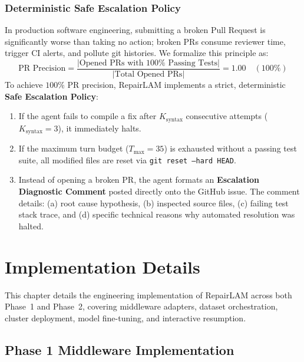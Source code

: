 \documentclass[12pt,a4paper]{report}
\begin{document}
\subsection{Deterministic Safe Escalation Policy}
In production software engineering, submitting a broken Pull Request is significantly worse than taking no action; broken PRs consume reviewer time, trigger CI alerts, and pollute git histories. We formalize this principle as:
\begin{equation}
    \text{PR Precision} = \frac{|\text{Opened PRs with } 100\% \text{ Passing Tests}|}{|\text{Total Opened PRs}|} = 1.00 \quad (100\%)
\end{equation}
To achieve $100\%$ PR precision, RepairLAM implements a strict, deterministic \textbf{Safe Escalation Policy}:
\begin{enumerate}
    \item If the agent fails to compile a fix after $K_{\text{syntax}}$ consecutive attempts ($K_{\text{syntax}} = 3$), it immediately halts.
    \item If the maximum turn budget ($T_{\text{max}} = 35$) is exhausted without a passing test suite, all modified files are reset via \texttt{git reset --hard HEAD}.
    \item Instead of opening a broken PR, the agent formats an \textbf{Escalation Diagnostic Comment} posted directly onto the GitHub issue. The comment details: (a) root cause hypothesis, (b) inspected source files, (c) failing test stack trace, and (d) specific technical reasons why automated resolution was halted.
\end{enumerate}

\newpage
\chapter{Implementation Details}

This chapter details the engineering implementation of RepairLAM across both Phase~1 and Phase~2, covering middleware adapters, dataset orchestration, cluster deployment, model fine-tuning, and interactive resumption.

\section{Phase 1 Middleware Implementation}
\end{document}
